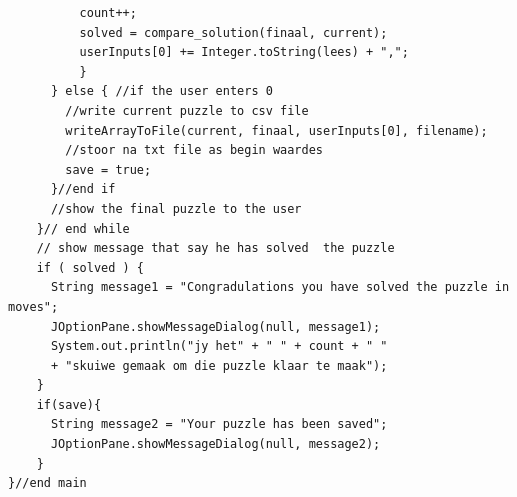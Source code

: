 \documentclass[10pt]{article}
\begin{document}
\begin{tiny}
\begin{verbatim}
          count++;
          solved = compare_solution(finaal, current);
          userInputs[0] += Integer.toString(lees) + ",";
          }  
      } else { //if the user enters 0
        //write current puzzle to csv file
        writeArrayToFile(current, finaal, userInputs[0], filename);
        //stoor na txt file as begin waardes
        save = true;
      }//end if
      //show the final puzzle to the user        
    }// end while  
    // show message that say he has solved  the puzzle
    if ( solved ) {
      String message1 = "Congradulations you have solved the puzzle in moves";
      JOptionPane.showMessageDialog(null, message1);
      System.out.println("jy het" + " " + count + " " 
      + "skuiwe gemaak om die puzzle klaar te maak");
    }
	if(save){
	  String message2 = "Your puzzle has been saved";
      JOptionPane.showMessageDialog(null, message2);
	}
}//end main
  

\end{verbatim}
\end{tiny}
\end{document}
